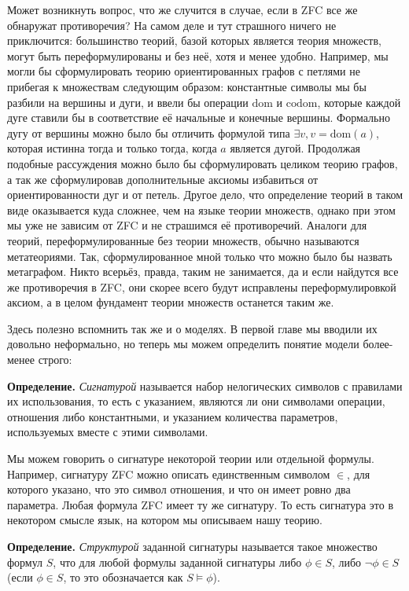 Может возникнуть вопрос, что же случится в случае, если в ZFC все же обнаружат противоречия? На самом деле и тут страшного ничего не приключится: большинство теорий, базой которых является теория множеств, могут быть переформулированы и без неё, хотя и менее удобно. Например, мы могли бы сформулировать теорию ориентированных графов с петлями не прибегая к множествам следующим образом: константные символы мы бы разбили на вершины и дуги, и ввели бы операции $\mathrm{dom}$ и $\mathrm{codom}$, которые каждой дуге ставили бы в соответствие её начальные и конечные вершины. Формально дугу от вершины можно было бы отличить формулой типа $\exists v, v=\mathrm{dom}(a)$, которая истинна тогда и только тогда, когда $a$ является дугой. Продолжая подобные рассуждения можно было бы сформулировать целиком теорию графов, а так же сформулировав дополнительные аксиомы избавиться от ориентированности дуг и от петель. Другое дело, что определение теорий в таком виде оказывается куда сложнее, чем на языке теории множеств, однако при этом мы уже не зависим от ZFC и не страшимся её противоречий. Аналоги для теорий, переформулированные без теории множеств, обычно называются метатеориями. Так, сформулированное мной только что можно было бы назвать метаграфом. Никто всерьёз, правда, таким не занимается, да и если найдутся все же противоречия в ZFC, они скорее всего будут исправлены переформулировкой аксиом, а в целом фундамент теории множеств останется таким же.

Здесь полезно вспомнить так же и о моделях. В первой главе мы вводили их довольно неформально, но теперь мы можем определить понятие модели более-менее строго:

{\bfseries Определение.} {\slshape Сигнатурой} называется набор нелогических символов с правилами их использования, то есть с указанием, являются ли они символами операции, отношения либо константными, и указанием количества параметров, используемых вместе с этими символами.

Мы можем говорить о сигнатуре некоторой теории или отдельной формулы. Например, сигнатуру ZFC можно описать единственным символом $\in$, для которого указано, что это символ отношения, и что он имеет ровно два параметра. Любая формула ZFC имеет ту же сигнатуру. То есть сигнатура это в некотором смысле язык, на котором мы описываем нашу теорию.

{\bfseries Определение.} {\slshape Структурой} заданной сигнатуры называется такое множество формул $S$, что для любой формулы заданной сигнатуры либо $\phi\in S$, либо $\neg\phi \in S$ (если $\phi\in S$, то это обозначается как $S\models\phi$).

